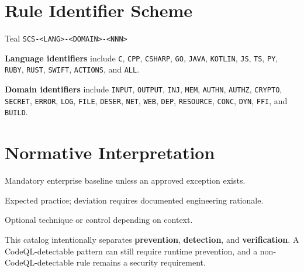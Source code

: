 \documentclass[10pt,letterpaper]{article}
\newcommand{\code}[1]{\texttt{\small #1}}
\begin{document}
\section{Rule Identifier Scheme}
\begin{callout}{Teal}
\centering
\Large\code{SCS-<LANG>-<DOMAIN>-<NNN>}
\end{callout}

\textbf{Language identifiers} include \code{C}, \code{CPP}, \code{CSHARP}, \code{GO}, \code{JAVA}, \code{KOTLIN}, \code{JS}, \code{TS}, \code{PY}, \code{RUBY}, \code{RUST}, \code{SWIFT}, \code{ACTIONS}, and \code{ALL}.

\textbf{Domain identifiers} include \code{INPUT}, \code{OUTPUT}, \code{INJ}, \code{MEM}, \code{AUTHN}, \code{AUTHZ}, \code{CRYPTO}, \code{SECRET}, \code{ERROR}, \code{LOG}, \code{FILE}, \code{DESER}, \code{NET}, \code{WEB}, \code{DEP}, \code{RESOURCE}, \code{CONC}, \code{DYN}, \code{FFI}, and \code{BUILD}.

\section{Normative Interpretation}
\begin{description}[leftmargin=2.0cm,labelwidth=1.65cm,style=nextline]
  \item[MUST / MUST NOT] Mandatory enterprise baseline unless an approved exception exists.
  \item[SHOULD / SHOULD NOT] Expected practice; deviation requires documented engineering rationale.
  \item[MAY] Optional technique or control depending on context.
\end{description}

This catalog intentionally separates \textbf{prevention}, \textbf{detection}, and \textbf{verification}. A CodeQL-detectable pattern can still require runtime prevention, and a non-CodeQL-detectable rule remains a security requirement.
\end{document}
